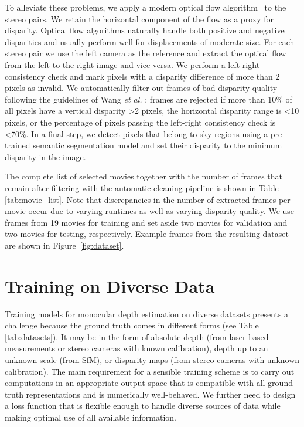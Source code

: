 To alleviate these problems, we apply a modern optical flow algorithm~\cite{Sun2018} to the stereo pairs. We retain the horizontal component of the flow as a proxy for disparity. Optical flow algorithms naturally handle both positive and negative disparities and usually perform well for displacements of moderate size. For each stereo pair we use the left camera as the reference and extract the optical flow from the left to the right image and vice versa. We perform a left-right consistency check and mark pixels with a disparity difference of more than 2 pixels as invalid. We automatically filter out frames of bad disparity quality following the guidelines of Wang \MakeLowercase{\textit{et al.}} \cite{Wang2019}: frames are rejected if more than 10\% of all pixels have a vertical disparity \textgreater 2 pixels, the horizontal disparity range is \textless 10 pixels, or the percentage of pixels passing the left-right consistency check is \textless 70\%.
In a final step, we detect pixels that belong to sky regions using a pre-trained semantic segmentation model \cite{RotaBulo2018} and set their disparity to the minimum disparity in the image.

The complete list of selected movies together with the number of frames that remain after filtering with the automatic cleaning pipeline is shown in Table \ref{tab:movie_list}. Note that discrepancies in the number of extracted frames per movie occur due to varying runtimes as well as varying disparity quality. We use frames from 19 movies for training and set aside two movies for validation and two movies for testing, respectively. Example frames from the resulting dataset are shown in Figure~\ref{fig:dataset}.

\section{Training on Diverse Data}
\label{sec:method}

Training models for monocular depth estimation on diverse datasets presents a challenge because the ground truth comes in different forms (see Table \ref{tab:datasets}).
It may be in the form of absolute depth (from laser-based measurements or stereo cameras with known calibration), depth up to an unknown scale (from SfM), or disparity maps (from stereo cameras with unknown calibration). The main requirement for a sensible training scheme is to carry out computations in an appropriate output space that is compatible with all ground-truth representations and is numerically well-behaved. We further need to design a loss function that is flexible enough to handle diverse sources of data while making optimal use of all available information.

